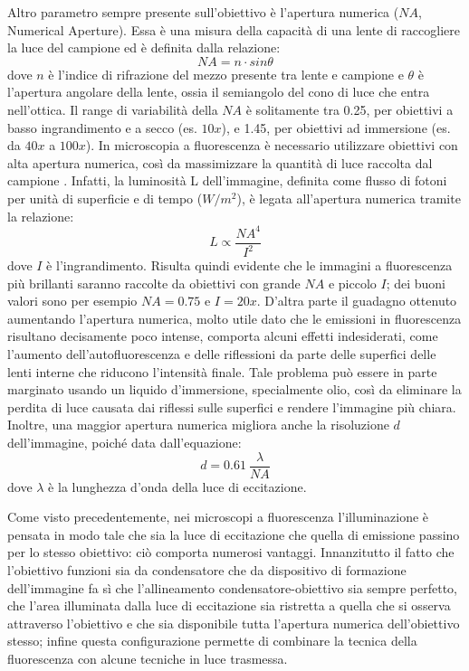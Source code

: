 Altro parametro sempre presente sull'obiettivo è l'apertura numerica ($NA$, Numerical Aperture). 
Essa è una misura della capacità di una lente di raccogliere la luce del campione ed è definita dalla relazione:
$$ NA = n \cdot sin \theta $$
dove $n$ è l'indice di rifrazione del mezzo presente tra lente e campione e $\theta$ è l'apertura angolare della lente, ossia il semiangolo del cono di luce che entra nell'ottica. 
Il range di variabilità della $NA$ è solitamente tra 0.25, per obiettivi a basso ingrandimento e a secco (es. $10x$), e 1.45, per obiettivi ad immersione (es. da $40x$ a $100x$). 
In microscopia a fluorescenza è necessario utilizzare obiettivi con alta apertura numerica, così da massimizzare la quantità di luce raccolta dal campione \cite{NA}.
Infatti, la luminosità L dell'immagine, definita come flusso di fotoni per unità di superficie e di tempo ($W/m^2$), è legata all'apertura numerica tramite la relazione:
$$L  \propto  \frac {NA^4}{I^2}$$
dove $I$ è l'ingrandimento. 
Risulta quindi evidente che le immagini a fluorescenza più brillanti saranno raccolte da obiettivi con grande $NA$ e piccolo $I$; dei buoni valori sono per esempio $NA=0.75$ e $I=20x$.
D'altra parte il guadagno ottenuto aumentando l'apertura numerica, molto utile dato che le emissioni in fluorescenza risultano decisamente poco intense, comporta alcuni effetti indesiderati, come l'aumento dell'autofluorescenza e delle riflessioni da parte delle superfici delle lenti interne che riducono l'intensità finale. 
Tale problema può essere in parte marginato usando un liquido d'immersione, specialmente olio, così da eliminare la perdita di luce
causata dai riflessi sulle superfici e rendere l'immagine più chiara. 
Inoltre, una maggior apertura numerica migliora anche la risoluzione $d$ dell'immagine, poiché data dall'equazione:
$$d = 0.61 \ \frac {\lambda}{NA} $$
dove $\lambda$ è la lunghezza d'onda della luce di eccitazione.

Come visto precedentemente, nei microscopi a fluorescenza l'illuminazione è pensata in modo tale che sia la luce di eccitazione che quella di emissione passino per lo stesso obiettivo: ciò comporta numerosi vantaggi. 
Innanzitutto il fatto che l'obiettivo funzioni sia da condensatore che da dispositivo di formazione dell'immagine fa sì che l'allineamento condensatore-obiettivo sia sempre perfetto, che l'area illuminata dalla luce di eccitazione sia ristretta a quella che si osserva attraverso l'obiettivo e che sia disponibile tutta l'apertura numerica dell'obiettivo stesso; infine questa configurazione permette di combinare la tecnica della fluorescenza con alcune tecniche in luce trasmessa.


